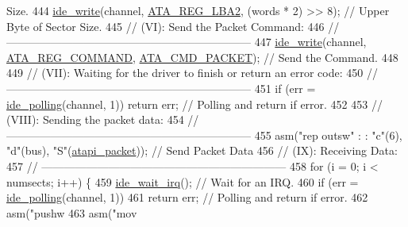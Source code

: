 \begin{DoxyCode}
{       Size.}
444    \hyperlink{a00032_afdb22c37a32d86fcb64e55b3edab4790_afdb22c37a32d86fcb64e55b3edab4790}{ide\_write}(channel, \hyperlink{a00032_afaf134917cbfc81c86b4e1d67930757a_afaf134917cbfc81c86b4e1d67930757a}{ATA\_REG\_LBA2}, (words * 2) >> 8);   \textcolor{comment}{// Upper Byte of Sector Size.}
445    \textcolor{comment}{// (VI): Send the Packet Command:}
446    \textcolor{comment}{// ------------------------------------------------------------------}
447    \hyperlink{a00032_afdb22c37a32d86fcb64e55b3edab4790_afdb22c37a32d86fcb64e55b3edab4790}{ide\_write}(channel, \hyperlink{a00032_a1a54069e05845badff84e1490ca4681e_a1a54069e05845badff84e1490ca4681e}{ATA\_REG\_COMMAND}, \hyperlink{a00032_afaaead63f9b69425b9f6514b03f0bbb2_afaaead63f9b69425b9f6514b03f0bbb2}{ATA\_CMD\_PACKET});      \textcolor{comment}{// Send
       the Command.}
448  
449    \textcolor{comment}{// (VII): Waiting for the driver to finish or return an error code:}
450    \textcolor{comment}{// ------------------------------------------------------------------}
451    \textcolor{keywordflow}{if} (err = \hyperlink{a00032_a03e85b94d6fbfb957e1b88c3dd064eca_a03e85b94d6fbfb957e1b88c3dd064eca}{ide\_polling}(channel, 1)) \textcolor{keywordflow}{return} err;         \textcolor{comment}{// Polling and return if error.}
452  
453    \textcolor{comment}{// (VIII): Sending the packet data:}
454    \textcolor{comment}{// ------------------------------------------------------------------}
455    \textcolor{keyword}{asm}(\textcolor{stringliteral}{"rep   outsw"} : : \textcolor{stringliteral}{"c"}(6), \textcolor{stringliteral}{"d"}(bus), \textcolor{stringliteral}{"S"}(\hyperlink{a00032_a02351861ecf3191d5dbbcc1910b7c109_a02351861ecf3191d5dbbcc1910b7c109}{atapi\_packet}));   \textcolor{comment}{// Send Packet Data}
456    \textcolor{comment}{// (IX): Receiving Data:}
457    \textcolor{comment}{// ------------------------------------------------------------------}
458    \textcolor{keywordflow}{for} (i = 0; i < numsects; i++) \{
459       \hyperlink{a00032_a31655fcec0cc8f9f8792b98cd4441fdf_a31655fcec0cc8f9f8792b98cd4441fdf}{ide\_wait\_irq}();                  \textcolor{comment}{// Wait for an IRQ.}
460       \textcolor{keywordflow}{if} (err = \hyperlink{a00032_a03e85b94d6fbfb957e1b88c3dd064eca_a03e85b94d6fbfb957e1b88c3dd064eca}{ide\_polling}(channel, 1))
461          \textcolor{keywordflow}{return} err;      \textcolor{comment}{// Polling and return if error.}
462       \textcolor{keyword}{asm}(\textcolor{stringliteral}{"pushw %
463       \textcolor{keyword}{asm}(\textcolor{stringliteral}{"mov %
}}
\end{DoxyCode}
